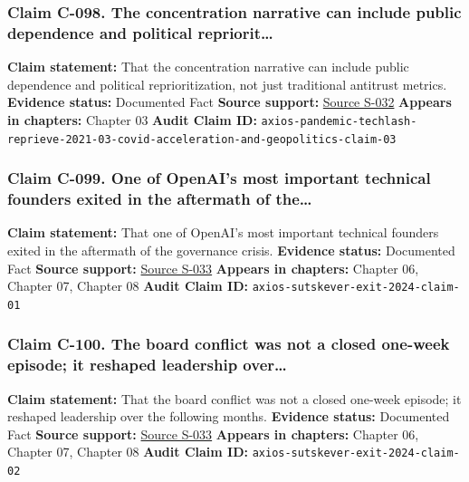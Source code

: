 \documentclass[
  american,
  11pt,
  letterpaper,
]{article}
\begin{document}
\subsubsection{Claim C-098. The concentration narrative can include
public dependence and political
repriorit\ldots{}}\label{claim-c-098-the-concentration-narrative-can-include-public-dependence-and-political-repriorit}

\textbf{Claim statement:} That the concentration narrative can include
public dependence and political reprioritization, not just traditional
antitrust metrics. \textbf{Evidence status:} Documented Fact
\textbf{Source support:}
\hyperref[source-s-032-pandemic-provides-a-techlash-reprieve]{Source
S-032} \textbf{Appears in chapters:} Chapter 03 \textbf{Audit Claim ID:}
\texttt{axios-pandemic-techlash-reprieve-2021-03-covid-acceleration-and-geopolitics-claim-03}

\subsubsection{Claim C-099. One of OpenAI's most important technical
founders exited in the aftermath of
the\ldots{}}\label{claim-c-099-one-of-openai-s-most-important-technical-founders-exited-in-the-aftermath-of-the}

\textbf{Claim statement:} That one of OpenAI's most important technical
founders exited in the aftermath of the governance crisis.
\textbf{Evidence status:} Documented Fact \textbf{Source support:}
\hyperref[source-s-033-openai-co-founder-ilya-sutskever-to-exit-firm]{Source
S-033} \textbf{Appears in chapters:} Chapter 06, Chapter 07, Chapter 08
\textbf{Audit Claim ID:} \texttt{axios-sutskever-exit-2024-claim-01}

\subsubsection{Claim C-100. The board conflict was not a closed one-week
episode; it reshaped leadership
over\ldots{}}\label{claim-c-100-the-board-conflict-was-not-a-closed-one-week-episode-it-reshaped-leadership-over}

\textbf{Claim statement:} That the board conflict was not a closed
one-week episode; it reshaped leadership over the following months.
\textbf{Evidence status:} Documented Fact \textbf{Source support:}
\hyperref[source-s-033-openai-co-founder-ilya-sutskever-to-exit-firm]{Source
S-033} \textbf{Appears in chapters:} Chapter 06, Chapter 07, Chapter 08
\textbf{Audit Claim ID:} \texttt{axios-sutskever-exit-2024-claim-02}
\end{document}
